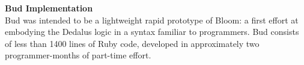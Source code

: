 \textbf{Bud Implementation}\\
Bud was intended to be a lightweight rapid prototype of Bloom: a first effort at embodying the Dedalus logic in a syntax familiar to programmers.  Bud consists of less than 1400 lines of Ruby code, developed in approximately two programmer-months of part-time effort.


\begin{comment}
A Bud program is just a Ruby class definition.  To make it operational, a small amount of imperative Ruby code is needed to create an instance of the class and invoke the Bud \texttt{run} method.  This imperative code can then be launched on as many nodes as desired (e.g., via the popular Capistrano package for Ruby deployments).  Messages targeted at those nodes are handled according to the Bud specification.  As an alternative to the \texttt{run} method, the Bud class also provides a \texttt{tick} method that can be used to force evaluation of a single timestep; this is useful for debugging Bloom code with standard Ruby debugging tools, or for executing a Bud specification that is intended as a ``one-shot'' query.

\jmh{The next paragraph could easily be chopped.  The preceding paragraph too, but it's more important to understand how things work.}
Because Bud is pure Ruby, some programmers may choose to embed it as a Domain-Specific Language within traditional imperative Ruby code.  In fact, nothing prevents a subclass of Bud from having both Bloom code in \texttt{declare} methods and imperative code in traditional Ruby methods.  This is a fairly common usage model, akin to using the Ruby on Rails package to integrate declarative data management statements with imperative Ruby. A mixture of declarative Bloom methods and imperative Ruby allows the full range of existing Ruby code---including the extensive RubyGems repositories---to be combined with checkable distributed Bloom programs. The analyses we describe in the remaining sections still apply in these cases; the imperative Ruby code interacts with the Bloom logic in the same way as any external agent sending network messages.
\end{comment}
